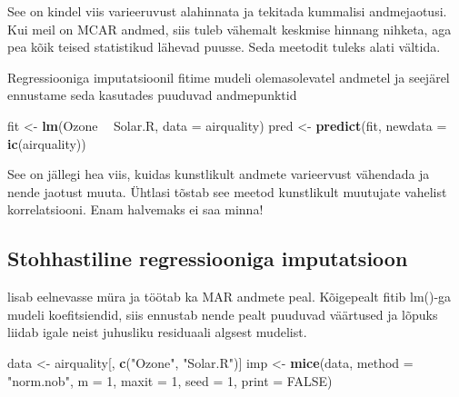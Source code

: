 \documentclass[]{book}
\newenvironment{Shaded}{\begin{snugshade}}{\end{snugshade}}
\newcommand{\DataTypeTok}[1]{\textcolor[rgb]{0.13,0.29,0.53}{#1}}
\newcommand{\DecValTok}[1]{\textcolor[rgb]{0.00,0.00,0.81}{#1}}
\newcommand{\KeywordTok}[1]{\textcolor[rgb]{0.13,0.29,0.53}{\textbf{#1}}}
\newcommand{\NormalTok}[1]{#1}
\newcommand{\OperatorTok}[1]{\textcolor[rgb]{0.81,0.36,0.00}{\textbf{#1}}}
\newcommand{\OtherTok}[1]{\textcolor[rgb]{0.56,0.35,0.01}{#1}}
\newcommand{\StringTok}[1]{\textcolor[rgb]{0.31,0.60,0.02}{#1}}
\begin{document}
See on kindel viis varieeruvust alahinnata ja tekitada kummalisi andmejaotusi. Kui meil on MCAR andmed, siis tuleb vähemalt keskmise hinnang nihketa, aga pea kõik teised statistikud lähevad puusse. Seda meetodit tuleks alati vältida.

Regressiooniga imputatsioonil fitime mudeli olemasolevatel andmetel ja seejärel ennustame seda kasutades puuduvad andmepunktid

\begin{Shaded}
\begin{Highlighting}[]
\NormalTok{fit <-}\StringTok{ }\KeywordTok{lm}\NormalTok{(Ozone }\OperatorTok{~}\StringTok{ }\NormalTok{Solar.R, }\DataTypeTok{data =}\NormalTok{ airquality)}
\NormalTok{pred <-}\StringTok{ }\KeywordTok{predict}\NormalTok{(fit, }\DataTypeTok{newdata =} \KeywordTok{ic}\NormalTok{(airquality))}
\end{Highlighting}
\end{Shaded}

See on jällegi hea viis, kuidas kunstlikult andmete varieervust vähendada ja nende jaotust muuta. Ühtlasi tõstab see meetod kunstlikult muutujate vahelist korrelatsiooni. Enam halvemaks ei saa minna!

\hypertarget{stohhastiline-regressiooniga-imputatsioon}{%
\subsection{Stohhastiline regressiooniga imputatsioon}\label{stohhastiline-regressiooniga-imputatsioon}}

lisab eelnevasse müra ja töötab ka MAR andmete peal. Kõigepealt fitib lm()-ga mudeli koefitsiendid, siis ennustab nende pealt puuduvad väärtused ja lõpuks liidab igale neist juhusliku residuaali algsest mudelist.

\begin{Shaded}
\begin{Highlighting}[]
\NormalTok{data <-}\StringTok{ }\NormalTok{airquality[, }\KeywordTok{c}\NormalTok{(}\StringTok{"Ozone"}\NormalTok{, }\StringTok{"Solar.R"}\NormalTok{)]}
\NormalTok{imp <-}\StringTok{ }\KeywordTok{mice}\NormalTok{(data, }\DataTypeTok{method =} \StringTok{"norm.nob"}\NormalTok{, }\DataTypeTok{m =} \DecValTok{1}\NormalTok{, }\DataTypeTok{maxit =} \DecValTok{1}\NormalTok{,}
            \DataTypeTok{seed =} \DecValTok{1}\NormalTok{, }\DataTypeTok{print =} \OtherTok{FALSE}\NormalTok{)}
\end{Highlighting}
\end{Shaded}
\end{document}
